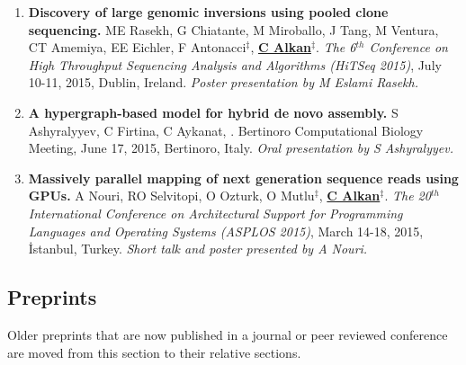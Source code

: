 \begin{enumerate}
\item
{\bf Discovery of large genomic inversions using pooled clone sequencing.}
ME Rasekh, G Chiatante, M Miroballo, J Tang, M Ventura, CT Amemiya, EE Eichler, F Antonacci$^\ddag$, {\bf {\underline{C Alkan}}}$^\ddag$.
{\em The 6$^{th}$ Conference on High Throughput Sequencing Analysis and Algorithms (HiTSeq 2015)}, 
July 10-11, 2015, Dublin, Ireland. {\it Poster presentation by M Eslami Rasekh.}

\item
  {\bf  A hypergraph-based model for hybrid de novo assembly.}
  S Ashyralyyev, C Firtina, C Aykanat, \calkan{}.
  Bertinoro Computational Biology Meeting, June 17, 2015, Bertinoro, Italy. {\it Oral presentation by S Ashyralyyev.}

\item
 {\bf Massively parallel mapping of next generation sequence reads using GPUs.}
  A Nouri, RO Selvitopi, O Ozturk, O Mutlu$^\ddag$, {\bf {\underline{C Alkan}}}$^\ddag$.
{\em The 20$^{th}$ International Conference on Architectural Support for Programming Languages and Operating Systems (ASPLOS 2015)}, 
March 14-18, 2015, İstanbul, Turkey. {\it Short talk and poster presented by A Nouri.}

\end{enumerate}


\vspace{-.4cm}
\subsection{\small \sc  Preprints}
 \vspace{-0.6cm}

\small{
Older preprints that are now published in a journal or peer reviewed conference are moved from this section to their relative sections.
}


